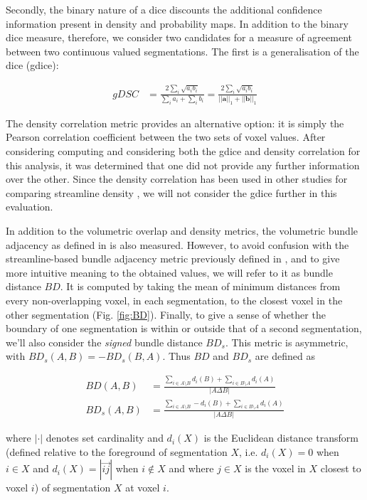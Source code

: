 Secondly, the binary nature of a \gls{dice} discounts the additional confidence information present in density and probability maps.
In addition to the binary \gls{dice} measure, therefore, we consider two candidates for a measure of agreement between two continuous valued segmentations.
The first is a generalisation of the \gls{dice} (\gls{gdice}):

\begin{align}
  gDSC &= \frac{2 \sum_i \sqrt{a_ib_i} }{\sum_ia_i + \sum_ib_i}
  =  \frac{2 \sum_i \sqrt{a_ib_i} }{||\mathbf{a}||_1 + ||\mathbf{b}||_1}
\end{align}

The density correlation metric provides an alternative option:
it is simply the Pearson correlation coefficient between the two sets of voxel values.
After considering computing and considering both the \gls{gdice} and density correlation for this analysis, it was determined that one did not provide any further information over the other.
Since the density correlation has been used in other studies for comparing streamline density , we will not consider the \gls{gdice} further in this evaluation.

In addition to the volumetric overlap and density metrics, the volumetric bundle adjacency as defined in \textcite{Schilling2021a} is also measured.
However, to avoid confusion with the streamline-based bundle adjacency\autocite{Radwan2022, Garyfallidis2012, Rheault2022} metric previously defined in \textcite{Garyfallidis2012},
and to give more intuitive meaning to the obtained values, we will refer to it as bundle distance $BD$.
It is computed by taking the mean of minimum distances from every non-overlapping voxel, in each segmentation, to the closest voxel in the other segmentation (Fig. \ref{fig:BD}).
Finally, to give a sense of whether the boundary of one segmentation is within or outside that of a second segmentation, we'll also consider the \textit{signed} bundle distance $BD_s$.
This metric is asymmetric, with $BD_s (A,B) = -BD_s(B,A)$.
Thus $BD$ and $BD_s$ are defined as

\begin{align}
  BD(A,B) &= \frac{\sum_{i \in A\setminus B} d_i(B) + \sum_{i \in B\setminus A} d_i(A)}{|A\Delta B|} \label{eq:bd} \\
  BD_s(A,B) &= \frac{\sum_{i \in A\setminus B} - d_i(B) + \sum_{i \in B\setminus A} d_i(A)}{|A\Delta B|} \label{eq:bds}
\end{align}

where $| \cdot |$ denotes set cardinality and $d_i(X)$ is the Euclidean distance transform (defined relative to the foreground of segmentation $X$, i.e. $d_i(X) = 0$ when $i \in X $ and $d_i(X) = |\overrightarrow{ij}|$ when $i \not\in X$ and where $j \in X$ is the voxel in $X$ closest to voxel $i$)  of segmentation $X$ at voxel $i$.

